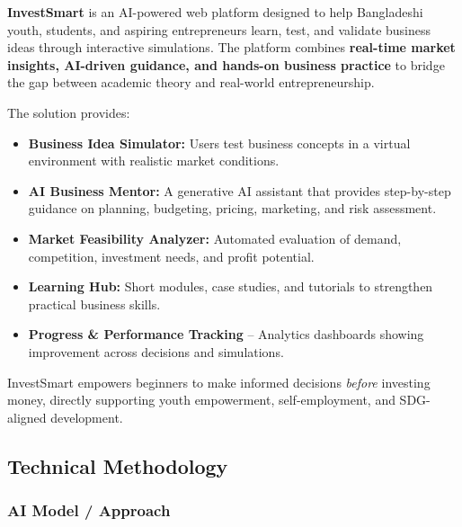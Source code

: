 \documentclass[12pt,letterpaper]{article}
\begin{document}
\textbf{InvestSmart} is an AI-powered web platform designed to help Bangladeshi youth, students, and aspiring entrepreneurs learn, test, and validate business ideas through interactive simulations. The platform combines \textbf{real-time market insights, AI-driven guidance, and hands-on business practice} to bridge the gap between academic theory and real-world entrepreneurship.

The solution provides:

\begin{itemize}
    \item \textbf{Business Idea Simulator:} Users test business concepts in a virtual environment with realistic market conditions.
    
    \item \textbf{AI Business Mentor:} A generative AI assistant that provides step-by-step guidance on planning, budgeting, pricing, marketing, and risk assessment.
    
    \item \textbf{Market Feasibility Analyzer:} Automated evaluation of demand, competition, investment needs, and profit potential.
    
    \item \textbf{Learning Hub:} Short modules, case studies, and tutorials to strengthen practical business skills.
    
    \item \textbf{Progress \& Performance Tracking} – Analytics dashboards showing improvement across decisions and simulations.
\end{itemize}



InvestSmart empowers beginners to make informed decisions \textit{before} investing money, directly supporting youth empowerment, self-employment, and SDG-aligned development.




\subsection{Technical Methodology}

\subsubsection{ AI Model / Approach}
\end{document}
